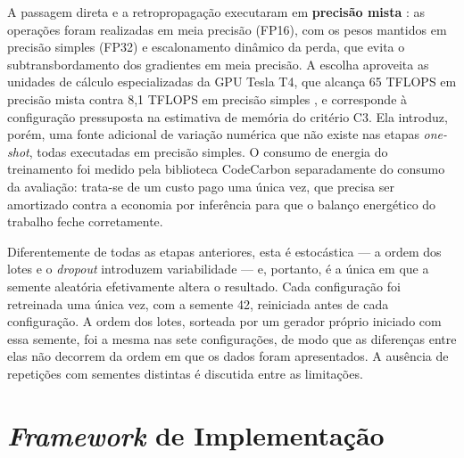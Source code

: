A passagem direta e a retropropagação executaram em \textbf{precisão mista}
\cite{Micikevicius2018}: as operações foram realizadas em meia precisão (FP16), com os
pesos mantidos em precisão simples (FP32) e escalonamento dinâmico da perda, que evita o
subtransbordamento dos gradientes em meia precisão. A escolha aproveita as unidades de
cálculo especializadas da GPU Tesla T4, que alcança 65 TFLOPS em precisão mista contra
8,1 TFLOPS em precisão simples \cite{NVIDIA2019T4}, e corresponde à configuração
pressuposta na estimativa de memória do critério C3.
Ela introduz, porém, uma fonte adicional
de variação numérica que não existe nas etapas \textit{one-shot}, todas executadas em
precisão simples. O consumo de energia do treinamento foi medido pela biblioteca
CodeCarbon separadamente do consumo da avaliação: trata-se de um custo pago uma única vez,
que precisa ser amortizado contra a economia por inferência para que o balanço energético
do trabalho feche corretamente.

Diferentemente de todas as etapas anteriores, esta é estocástica --- a ordem dos lotes e o
\textit{dropout} introduzem variabilidade --- e, portanto, é a única em que a semente
aleatória efetivamente altera o resultado. Cada configuração foi retreinada uma única vez,
com a semente 42, reiniciada antes de cada configuração. A ordem dos lotes, sorteada por um
gerador próprio iniciado com essa semente, foi a mesma nas sete configurações, de modo que
as diferenças entre elas não decorrem da ordem em que os dados foram apresentados. A
ausência de repetições com sementes distintas é discutida entre as limitações.

\section{\textit{Framework} de Implementação}\label{sec:framework}


